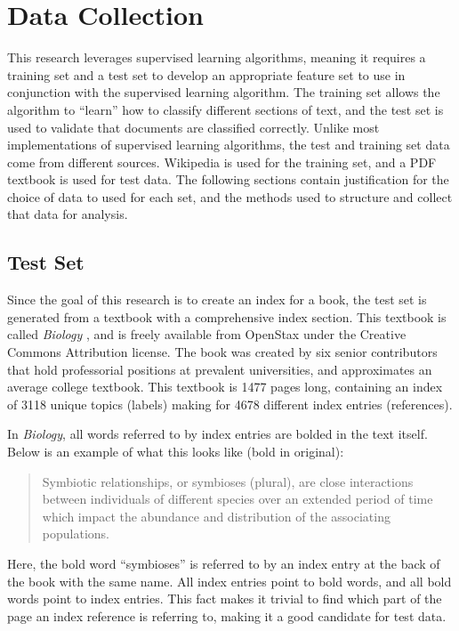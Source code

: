 \section{Data Collection}

This research leverages supervised learning algorithms, meaning it requires a training set and a test set to develop an appropriate feature set to use in conjunction with the supervised learning algorithm.
The training set allows the algorithm to “learn” how to classify different sections of text, and the test set is used to validate that documents are classified correctly.
Unlike most implementations of supervised learning algorithms, the test and training set data come from different sources.
Wikipedia is used for the training set, and a PDF textbook is used for test data.
The following sections contain justification for the choice of data to used for each set, and the methods used to structure and collect that data for analysis.

\subsection{Test Set}

Since the goal of this research is to create an index for a book, the test set is generated from a textbook with a comprehensive index section.
This textbook is called {\it Biology} \cite{biology}, and is freely available from OpenStax \cite{openstax-bio} under the Creative Commons Attribution license.
The book was created by six senior contributors that hold professorial positions at prevalent universities, and approximates an average college textbook.
This textbook is 1477 pages long, containing an index of 3118 unique topics (labels) making for 4678 different index entries (references).

In {\it Biology}, all words referred to by index entries are bolded in the text itself. Below is an example of what this looks like (bold in original):

\begin{quote}
Symbiotic relationships, or symbioses (plural), are close interactions between individuals of different species over an extended period of time which impact the abundance and distribution of the associating populations. \cite{biology}
\end{quote}

\noindent Here, the bold word “symbioses” is referred to by an index entry at the back of the book with the same name. All index entries point to bold words, and all bold words point to index entries. This fact makes it trivial to find which part of the page an index reference is referring to, making it a good candidate for test data.

